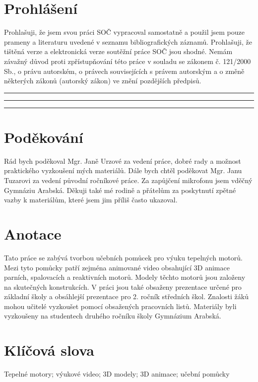 \newpage

\section*{Prohlášení}
{Prohlašuji, že jsem svou práci SOČ vypracoval samostatně a použil jsem pouze prameny a literaturu uvedené v seznamu bibliografických záznamů.}\odst
{Prohlašuji, že tištěná verze a elektronická verze soutěžní práce SOČ jsou shodné.}\odst
{Nemám závažný důvod proti zpřístupňování této práce v souladu se zákonem č. 121/2000 Sb., o právu autorském, o právech souvisejících s právem autorským a o změně některých zákonů (autorský zákon) ve znění pozdějších předpisů.}\par
\vspace{2cm}
\noindent\rule{3cm}{0.4pt}
\noindent\rule{3cm}{0.4pt}
\hfill
{}
\noindent\rule{5cm}{0.4pt}

\newpage

\section*{Poděkování}
{Rád bych poděkoval Mgr. Janě Urzové za vedení práce, dobré rady a možnost praktického vyzkoušení mých materiálů. Dále bych chtěl poděkovat  Mgr. Janu Tuzarovi za vedení původní ročníkové práce. Za zapůjčení mikrofonu jsem vděčný Gymnáziu Arabská. Děkuji také mé rodině a přátelům za poskytnutí zpětné vazby k materiálům, které jsem jim příliš často ukazoval.}

\newpage

\section*{Anotace}
{Tato práce se zabývá tvorbou učebních pomůcek pro výuku tepelných motorů. Mezi tyto pomůcky patří zejména animované video obsahující 3D animace parních, spalovacích a reaktivních motorů. Modely těchto motorů jsou založeny na skutečných konstrukcích. V práci jsou také obsaženy prezentace určené pro základní školy a obsáhlejší prezentace pro 2. ročník středních škol. Znalosti žáků mohou učitelé vyzkoušet pomocí obsažených pracovních listů. Materiály byli vyzkoušeny na studentech druhého ročníku školy Gymnázium Arabská.}

\section*{Klíčová slova}
{Tepelné motory; výukové video; 3D modely; 3D animace; učební pomůcky}

